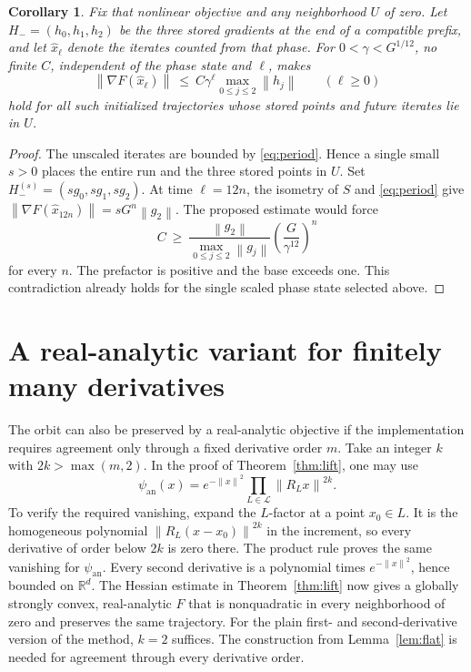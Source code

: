 \documentclass[11pt]{article}
\newtheorem{corollary}[theorem]{Corollary}
\newcommand{\R}{\mathbb R}
\newcommand{\norm}[1]{\left\lVert#1\right\rVert}
\begin{document}
\begin{corollary}\label{cor:local}
Fix that nonlinear objective and any neighborhood \(U\) of zero.
Let \(H_-=(h_0,h_1,h_2)\) be the three stored gradients at the end
of a compatible prefix, and let \(\widehat x_\ell\) denote the
iterates counted from that phase. For \(0<\gamma<G^{1/12}\), no
finite \(C\), independent of the phase state and \(\ell\), makes
\[
 \norm{\nabla F(\widehat x_\ell)}
 \ \le\ C\gamma^\ell \max_{0\le j\le2}\norm{h_j}
 \qquad(\ell\ge0)
\]
hold for all such initialized trajectories whose stored points
and future iterates lie in \(U\).
\end{corollary}

\begin{proof}
The unscaled iterates are bounded by \eqref{eq:period}. Hence a
single small \(s>0\) places the entire run and the three stored
points in \(U\). Set \(H_-^{(s)}=(s g_0,s g_1,s g_2)\). At time
\(\ell=12n\), the isometry of \(S\) and \eqref{eq:period} give
\(\norm{\nabla F(\widehat x_{12n})}=s G^n \norm{g_2}\).
The proposed estimate would force
\[
 C\ \ge\
 \frac{\norm{g_2}}{\max_{0\le j\le2}\norm{g_j}}
 \left(\frac{G}{\gamma^{12}}\right)^n
\]
for every \(n\). The prefactor is positive and the base exceeds
one. This contradiction already holds for the single scaled phase
state selected above.
\end{proof}

\section{A real-analytic variant for finitely many derivatives}

The orbit can also be preserved by a real-analytic objective if
the implementation requires agreement only through a fixed derivative
order \(m\). Take an integer \(k\) with \(2k>\max(m,2)\).
In the proof of
Theorem~\ref{thm:lift}, one may use
\[
 \psi_{\mathrm{an}}(x)
 = e^{-\norm{x}^2}\prod_{L\in\mathcal L}\norm{R_Lx}^{2k}.
\]
To verify the required vanishing, expand the \(L\)-factor at a point
\(x_0\in L\). It is the homogeneous polynomial
\(\norm{R_L(x-x_0)}^{2k}\) in the increment, so every derivative of
order below \(2k\) is zero there. The product rule proves the same
vanishing for \(\psi_{\mathrm{an}}\). Every second derivative is a
polynomial times \(e^{-\norm{x}^2}\), hence bounded on \(\R^d\).
The Hessian estimate in Theorem~\ref{thm:lift} now gives a globally
strongly convex, real-analytic \(F\) that is nonquadratic in every
neighborhood of zero and preserves the same trajectory. For the
plain first- and second-derivative version of the method, \(k=2\)
suffices. The construction from Lemma~\ref{lem:flat} is needed for
agreement through every derivative order.
\end{document}
